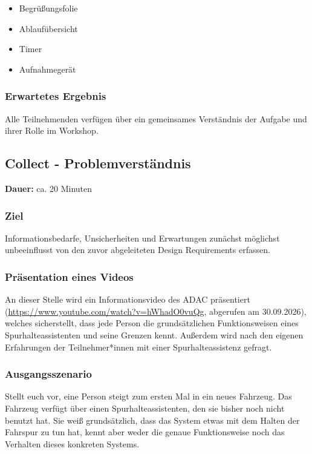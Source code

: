 \begin{itemize}
    \item Begrüßungsfolie
    \item Ablaufübersicht
    \item Timer
    \item Aufnahmegerät
\end{itemize}

\subsubsection*{Erwartetes Ergebnis}

Alle Teilnehmenden verfügen über ein gemeinsames Verständnis der Aufgabe und ihrer Rolle im Workshop.


\clearpage

\subsection{Collect - Problemverständnis}
\label{subsec:workshop-collect}

\noindent
\textbf{Dauer:} ca. 20 Minuten

\subsubsection*{Ziel}

Informationsbedarfe, Unsicherheiten und Erwartungen zunächst möglichst
unbeeinflusst von den zuvor abgeleiteten Design Requirements erfassen.

\subsubsection*{Präsentation eines Videos}
An dieser Stelle wird ein Informationsvideo des ADAC präsentiert (\url{https://www.youtube.com/watch?v=hWhadO0vuQg}, abgerufen am 30.09.2026), welches sicherstellt, dass jede Person die grundsätzlichen Funktionsweisen eines Spurhalteassistenten und seine Grenzen kennt. Außerdem wird nach den eigenen Erfahrungen der Teilnehmer*innen mit einer Spurhalteassistenz gefragt.

\subsubsection*{Ausgangsszenario}

Stellt euch vor, eine Person steigt zum ersten Mal in ein neues Fahrzeug. Das Fahrzeug verfügt über einen Spurhalteassistenten, den sie bisher noch nicht benutzt hat. Sie weiß grundsätzlich, dass das System etwas mit dem Halten der Fahrspur zu tun hat, kennt aber weder die genaue Funktionsweise noch das Verhalten dieses konkreten Systems.

